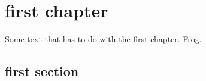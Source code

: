 \documentclass[
    letterpaper %
]{book}
\begin{document}
\tableofcontents
\listoffigures

\chapter{first chapter}

Some text that has to do with the first chapter.  Frog.

\section{first section}

\printindex
\end{document}
